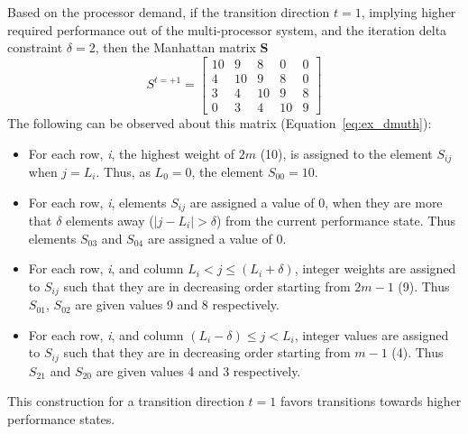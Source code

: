 Based on the processor demand, if the transition direction $t = 1$, implying higher required performance
out of the multi-processor system, and the iteration delta constraint $\delta = 2$, then the Manhattan matrix \textbf{S} 
\begin{equation}
    S^{t = +1} = \left[
     \begin{array}{ccccc}
       10 & 9 & 8 & 0 & 0 \\
       4 & 10 & 9 & 8 & 0 \\
       3 & 4 & 10 & 9 & 8 \\
       0 & 3 & 4 & 10 & 9
     \end{array}
   \right]
\label{eq:ex_dmuth}
\end{equation}
The following can be observed about this matrix (Equation~\eqref{eq:ex_dmuth}):
\begin{itemize}
\item For each row, \textit{i}, the highest weight of $2m$ (10), is assigned to the element 
$S_{ij}$ when $j = L_i$. Thus, as $L_0 = 0$, the element $S_{00} = 10$.
\item For each row, \textit{i}, elements $S_{ij}$ are assigned a value of 0,
when they are more that $\delta$ elements away ($|j - L_i| > \delta$) 
from the current performance state. Thus elements $S_{03}$ and $S_{04}$ are assigned a value of 0.
\item For each row, \textit{i}, and column $L_i < j \leq (L_i + \delta)$, integer weights are assigned 
to $S_{ij}$ such that they are in decreasing order starting from $2m-1$ (9).
Thus $S_{01}$, $S_{02}$ are given values 9 and 8 respectively. 
\item For each row, \textit{i}, and column $(L_i - \delta) \leq j < L_i$, integer values are assigned to 
$S_{ij}$ such that they are in decreasing order starting from $m-1$ (4).
Thus $S_{21}$ and $S_{20}$ are given values 4 and 3 respectively.
\end{itemize}
This construction for a transition direction $t = 1$ favors transitions towards higher performance states.

